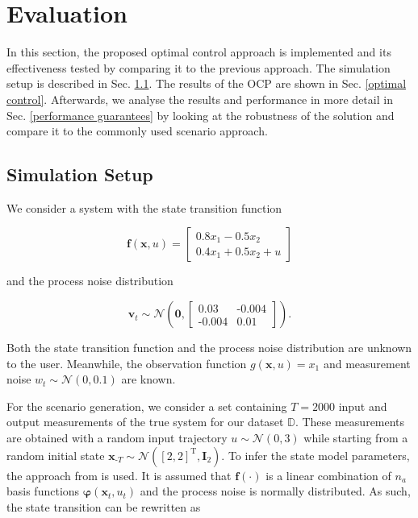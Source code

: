 \chapter{Evaluation} \label{Evaluation}

In this section, the proposed optimal control approach is implemented and its effectiveness tested by comparing it to the previous approach. The simulation setup is described in Sec. \ref{Setup}. The results of the OCP are shown in Sec. \ref{optimal control}. Afterwards, we analyse the results and performance in more detail in Sec. \ref{performance guarantees} by looking at the robustness of the solution and compare it to the commonly used scenario approach.

\section{Simulation Setup} \label{Setup}

We consider a system with the state transition function

\begin{equation}
\boldsymbol{f}(\boldsymbol{x}, u) = 
\begin{bmatrix}
0.8  x_1 - 0.5 x_2 \\
0.4 x_1 + 0.5 x_2 + u
\end{bmatrix}
\end{equation}

and the process noise distribution

\begin{equation}
\boldsymbol{v}_t \sim \mathcal{N} \left(\boldsymbol{0}, 
\begin{bmatrix}
0.03 & \text{-}0.004 \\
\text{-}0.004 & 0.01
\end{bmatrix}
\right).
\end{equation}

Both the state transition function and the process noise distribution are unknown to the user. Meanwhile, the observation function $g(\boldsymbol{x}, u) = x_1$ and measurement noise $w_t \sim \mathcal{N} (0, 0.1)$ are known. 


For the scenario generation, we consider a set containing $T = 2000$ input and output measurements of the true system for our dataset $\mathbb{D}$. These measurements are obtained with a random input trajectory $u \sim \mathcal{N} (0, 3)$ while starting from a random initial state $\boldsymbol{x}_{\text{-}T} \sim \mathcal{N} ([2, 2]^\text{T}, \boldsymbol{I}_2)$. To infer the state model parameters, the approach from \cite{Svensson_17} is used. It is assumed that $\boldsymbol{f}(\cdot)$ is a linear combination of $n_a$ basis functions $\boldsymbol{\varphi}(\boldsymbol{x}_t, u_t)$ and the process noise is normally distributed. As such, the state transition can be rewritten as

